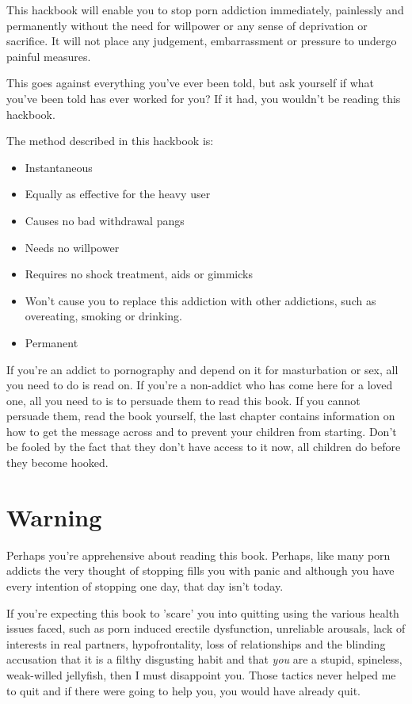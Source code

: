 \documentclass[easypeasy.tex]{subfiles}
\begin{document}
This hackbook will enable you to stop porn addiction immediately, painlessly and permanently without the need for willpower or any sense of deprivation or sacrifice. It will not place any judgement, embarrassment or pressure to undergo painful measures.

This goes against everything you've ever been told, but ask yourself if what you've been told has ever worked for you? If it had, you wouldn't be reading this hackbook.

The method described in this hackbook is:
\begin{itemize}
\item Instantaneous
\item Equally as effective for the heavy user
\item Causes no bad withdrawal pangs
\item Needs no willpower
\item Requires no shock treatment, aids or gimmicks
\item Won't cause you to replace this addiction with other addictions, such as overeating, smoking or drinking.
\item Permanent
\end{itemize}
If you're an addict to pornography and depend on it for masturbation or sex, all you need to do is read on.
If you're a non-addict who has come here for a loved one, all you need to is to persuade them to read this book.
If you cannot persuade them, read the book yourself, the last chapter contains information on how to get the message across and to prevent your children from starting. Don't be fooled by the fact that they don't have access to it now, all children do before they become hooked.

\section{Warning}
Perhaps you're apprehensive about reading this book. Perhaps, like many porn addicts the very thought of stopping fills you with panic and although you have every intention of stopping one day, that day isn't today.

If you're expecting this book to 'scare' you into quitting using the various health issues faced, such as porn induced erectile dysfunction, unreliable arousals, lack of interests in real partners, hypofrontality, loss of relationships and the blinding accusation that it is a filthy disgusting habit and that \textit{you} are a stupid, spineless, weak-willed jellyfish, then I must disappoint you. Those tactics never helped me to quit and if there were going to help you, you would have already quit.
\end{document}

